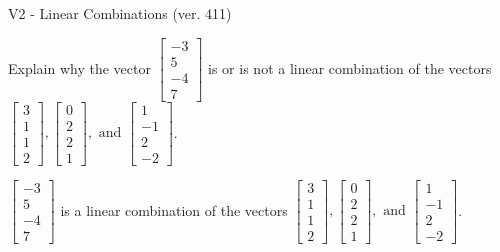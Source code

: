 \begin{exercise}
  \begin{exerciseTitle}V2 - Linear Combinations (ver. 411)\end{exerciseTitle}
  \begin{exerciseStatement}
    Explain why the vector \(\left[\begin{array}{c}
-3 \\
5 \\
-4 \\
7
\end{array}\right]\)  is or is not a linear 
	combination of the vectors \(\left[\begin{array}{c}
3 \\
1 \\
1 \\
2
\end{array}\right] , \left[\begin{array}{c}
0 \\
2 \\
2 \\
1
\end{array}\right] , \text{ and } \left[\begin{array}{c}
1 \\
-1 \\
2 \\
-2
\end{array}\right]\).
	


  \end{exerciseStatement}
  \begin{exerciseAnswer}
   \(\left[\begin{array}{c}
-3 \\
5 \\
-4 \\
7
\end{array}\right]\) 
  	 is  
	a linear combination of the vectors \(\left[\begin{array}{c}
3 \\
1 \\
1 \\
2
\end{array}\right] , \left[\begin{array}{c}
0 \\
2 \\
2 \\
1
\end{array}\right] , \text{ and } \left[\begin{array}{c}
1 \\
-1 \\
2 \\
-2
\end{array}\right]\).

	
  


  \end{exerciseAnswer}
\end{exercise}